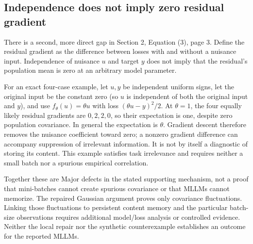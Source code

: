 \documentclass[10pt]{article}
\begin{document}
\subsection*{Independence does not imply zero residual gradient}
There is a second, more direct gap in Section 2, Equation (3), page 3. Define the residual gradient as the difference between losses with and without a nuisance input. Independence of nuisance \(u\) and target \(y\) does not imply that the residual’s population mean is zero at an arbitrary model parameter.\par
For an exact four-case example, let \(u,y\) be independent uniform signs, let the original input be the constant zero (so \(u\) is independent of both the original input and \(y\)), and use \(f_\theta(u)=\theta u\) with loss \((\theta u-y)^2/2\). At \(\theta=1\), the four equally likely residual gradients are \(0,2,2,0\), so their expectation is one, despite zero population covariance. In general the expectation is \(\theta\). Gradient descent therefore removes the nuisance coefficient toward zero; a nonzero gradient difference can accompany suppression of irrelevant information. It is not by itself a diagnostic of storing its content. This example satisfies task irrelevance and requires neither a small batch nor a spurious empirical correlation.\par
Together these are Major defects in the stated supporting mechanism, not a proof that mini-batches cannot create spurious covariance or that MLLMs cannot memorize. The repaired Gaussian argument proves only covariance fluctuations. Linking those fluctuations to persistent content memory and the particular batch-size observations requires additional model/loss analysis or controlled evidence. Neither the local repair nor the synthetic counterexample establishes an outcome for the reported MLLMs.\par
\end{document}
